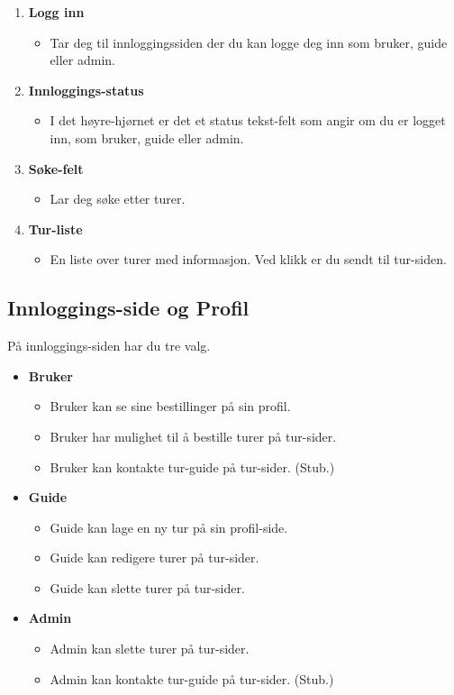 \documentclass[../doc]{subfiles}
\begin{document}
\begin{enumerate}
    \item \textbf{Logg inn}
    \begin{itemize}
        \item Tar deg til innloggingssiden der du kan logge deg inn som bruker, guide eller admin.
    \end{itemize}

    \item \textbf{Innloggings-status}
    \begin{itemize}
        \item I det høyre-hjørnet er det et status tekst-felt som angir om du er logget inn, som bruker, guide eller admin.
    \end{itemize}

    \item \textbf{Søke-felt}
    \begin{itemize}
        \item Lar deg søke etter turer.
    \end{itemize}

    \item \textbf{Tur-liste}
    \begin{itemize}
        \item En liste over turer med informasjon. Ved klikk er du sendt til tur-siden.
    \end{itemize}
\end{enumerate}

\subsection{Innloggings-side og Profil}
På innloggings-siden har du tre valg. 
\begin{itemize}
    \item \textbf{Bruker}
    \begin{itemize}
        \item Bruker kan se sine bestillinger på sin profil.
        \item Bruker har mulighet til å bestille turer på tur-sider.
        \item Bruker kan kontakte tur-guide på tur-sider. (Stub.)
    \end{itemize}
    \item \textbf{Guide}
    \begin{itemize}
        \item Guide kan lage en ny tur på sin profil-side.
        \item Guide kan redigere turer på tur-sider.
        \item Guide kan slette turer på tur-sider.
    \end{itemize}
    \item \textbf{Admin}
    \begin{itemize}
        \item Admin kan slette turer på tur-sider.
        \item Admin kan kontakte tur-guide på tur-sider. (Stub.)
    \end{itemize}
\end{itemize}
\end{document}
